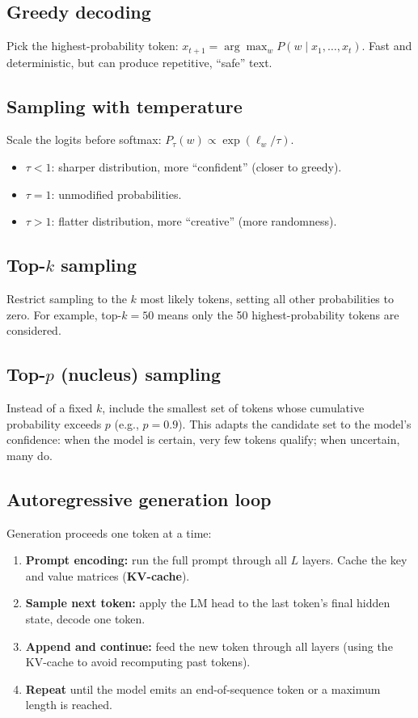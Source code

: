 \documentclass[11pt, twoside, openright]{memoir}
\begin{document}
\subsection{Greedy decoding}

Pick the highest-probability token:
$x_{t+1} = \arg\max_w P(w \mid x_1, \ldots, x_t)$.
Fast and deterministic, but can produce repetitive, ``safe'' text.

\subsection{Sampling with temperature}

Scale the logits before softmax:
$P_\tau(w) \propto \exp(\ell_w / \tau)$.
\begin{itemize}[nosep]
\item $\tau < 1$: sharper distribution, more ``confident'' (closer to greedy).
\item $\tau = 1$: unmodified probabilities.
\item $\tau > 1$: flatter distribution, more ``creative'' (more randomness).
\end{itemize}

\subsection{Top-$k$ sampling}

Restrict sampling to the $k$ most likely tokens, setting all other
probabilities to zero.  For example, top-$k = 50$ means only the 50
highest-probability tokens are considered.

\subsection{Top-$p$ (nucleus) sampling}

Instead of a fixed $k$, include the smallest set of tokens whose cumulative
probability exceeds $p$ (e.g., $p = 0.9$).  This adapts the candidate set
to the model's confidence: when the model is certain, very few tokens
qualify; when uncertain, many do.

\subsection{Autoregressive generation loop}

Generation proceeds one token at a time:
\begin{enumerate}[nosep]
\item \textbf{Prompt encoding:} run the full prompt through all $L$ layers.
  Cache the key and value matrices (\textbf{KV-cache}).
\item \textbf{Sample next token:} apply the LM head to the last token's
  final hidden state, decode one token.
\item \textbf{Append and continue:} feed the new token through all layers
  (using the KV-cache to avoid recomputing past tokens).
\item \textbf{Repeat} until the model emits an end-of-sequence token or
  a maximum length is reached.
\end{enumerate}
\end{document}
